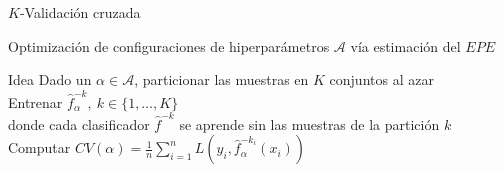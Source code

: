 \documentclass[xcolor=x11names]{beamer}
\begin{document}

\begin{frame}{$K$-Validación cruzada}

Optimización de configuraciones de hiperparámetros $\mathcal{A}$ vía estimación del $EPE$

	\begin{block}{Idea}
		Dado un $\alpha \in \mathcal{A}$, particionar las muestras en $K$ conjuntos al azar
		\\
		Entrenar $\hat{f}_{\alpha}^{-k}, \ k \in \{1, \ldots, K\}$
		\\
		donde cada clasificador $\hat{f}^{-k}$ se aprende sin las muestras de la partición $k$
		\\
		Computar $CV(\alpha) = \frac{1}{n} \sum^n_{i=1} L\left( y_i, \hat{f}_{\alpha}^{-k_i}(x_i) \right)$
	\end{block}

\end{frame}
\end{document}
